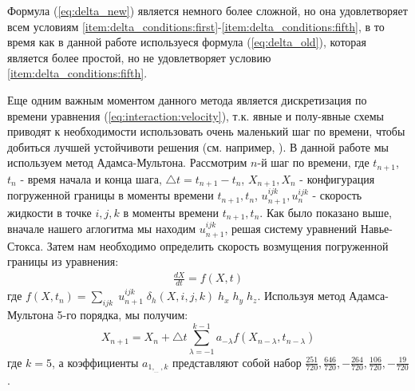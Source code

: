 Формула (\ref{eq:delta_new}) является немного более сложной, но она удовлетворяет всем условиям 
\ref{item:delta_conditions:first}-\ref{item:delta_conditions:fifth}, в то время как в данной работе
используеся формула (\ref{eq:delta_old}), которая является более простой, но не удовлетворяет условию \ref{item:delta_conditions:fifth}.

Еще одним важным моментом данного метода является дискретизация по времени уравнения (\ref{eq:interaction:velocity}),
т.к. явные и полу-явные схемы приводят к необходимости
использовать очень маленький шаг по времени, чтобы добиться лучшей устойчивоти решения (см. например, \cite{griffith2012immersed}).
В данной работе мы используем метод Адамса-Мультона. Рассмотрим $n$-й шаг по времени, где $t_{n+1}$, $t_n$ - время начала и конца шага,
$\triangle t = t_{n+1} - t_n$, $X_{n+1}, X_n$ - конфигурация погруженной границы в моменты времени $t_{n+1}, t_n$,
$u_{n+1}^{ijk}, u_n^{ijk}$ - скорость жидкости в точке $i,j,k$ в моменты времени $t_{n+1}, t_n$.
Как было показано выше, вначале нашего аглогитма мы находим $u_{n+1}^{ijk}$, решая систему уравнений Навье-Стокса.
Затем нам необходимо определить скорость возмущения погруженной границы из уравнения:
\begin{gather}
    \frac{dX}{dt} = f(X, t)
\end{gather}
где $f(X, t_n) = \sum_{ijk}\; u_{n+1}^{ijk} \; \delta_h(X, i, j, k) \; h_x\; h_y\;  h_z$.
Используя метод Адамса-Мультона 5-го порядка, мы получим:
\begin{equation}
    X_{n+1} = X_n + \triangle t \sum_{\lambda=-1}^{k-1} a_{-\lambda} f(X_{n-\lambda}, t_{n-\lambda})
\end{equation}
где $k=5$, а коэффициенты $a_{1, _{\dots}, k}$ представляют собой набор $\frac{251}{720}, \frac{646}{720}, -\frac{264}{720}, \frac{106}{720}, -\frac{19}{720}$.



